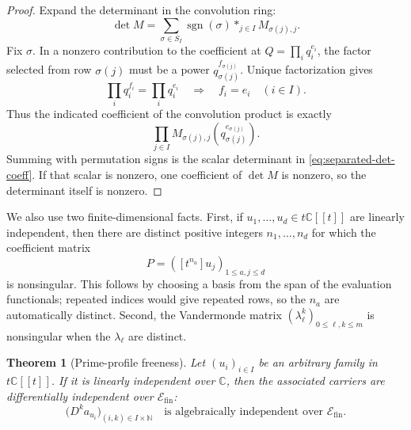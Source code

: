 \documentclass[11pt]{article}
\newtheorem{theorem}{Theorem}[section]
\theoremstyle{definition}
\theoremstyle{remark}
\newcommand{\C}{\mathbb C}
\newcommand{\N}{\mathbb N}
\newcommand{\Efin}{\mathcal E_{\mathrm{fin}}}
\begin{document}
\begin{proof}
Expand the determinant in the convolution ring:
\[
 \det M=\sum_{\sigma\in S_I}\operatorname{sgn}(\sigma)
          \mathop{*}_{j\in I}M_{\sigma(j),j}.
\]
Fix $\sigma$.  In a nonzero contribution to the coefficient at
$Q=\prod_iq_i^{e_i}$, the factor selected from row $\sigma(j)$ must be a power
$q_{\sigma(j)}^{f_{\sigma(j)}}$.  Unique factorization gives
\[
 \prod_iq_i^{f_i}=\prod_iq_i^{e_i}
 \quad\Longrightarrow\quad f_i=e_i\quad(i\in I).
\]
Thus the indicated coefficient of the convolution product is exactly
\[
 \prod_{j\in I}M_{\sigma(j),j}(q_{\sigma(j)}^{e_{\sigma(j)}}).
\]
Summing with permutation signs is the scalar determinant in
\eqref{eq:separated-det-coeff}.  If that scalar is nonzero, one coefficient of $\det M$ is
nonzero, so the determinant itself is nonzero.
\end{proof}

We also use two finite-dimensional facts.  First, if $u_1,\ldots,u_d\in t\C[[t]]$ are linearly
independent, then there are distinct positive integers $n_1,\ldots,n_d$ for which the coefficient
matrix
\begin{equation}\label{eq:profile-minor}
 P=([t^{n_a}]u_j)_{1\le a,j\le d}
\end{equation}
is nonsingular.  This follows by choosing a basis from the span of the evaluation functionals;
repeated indices would give repeated rows, so the $n_a$ are automatically distinct.  Second, the
Vandermonde matrix $(\lambda_\ell^k)_{0\le\ell,k\le m}$ is nonsingular when the
$\lambda_\ell$ are distinct.

\begin{theorem}[Prime-profile freeness]\label{thm:profile-freeness}
Let $(u_i)_{i\in I}$ be an arbitrary family in $t\C[[t]]$.  If it is linearly independent over
$\C$, then the associated carriers are differentially independent over $\Efin$:
\begin{equation}\label{eq:profile-freeness}
 \bigl(D^ka_{u_i}\bigr)_{(i,k)\in I\times\N}
 \quad\text{is algebraically independent over }\Efin.
\end{equation}
\end{theorem}
\end{document}
